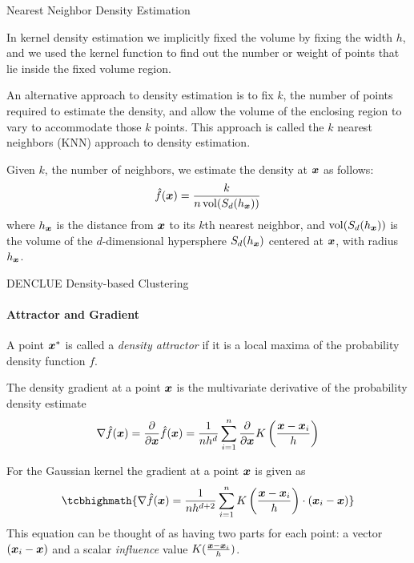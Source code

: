 \begin{frame}{Nearest Neighbor Density Estimation}

  In kernel density estimation we implicitly f\/{i}xed the
volume by f\/{i}xing the width $h$, and we used the
kernel function to f\/{i}nd out the number or weight of points that lie
inside the f\/{i}xed volume region. 

\medskip
An alternative approach to density
estimation is to f\/{i}x $k$, the number of points required to estimate the
density, and allow the volume of the enclosing region to vary to
accommodate those $k$ points. This
approach is called the $k$ nearest neighbors (KNN) approach to density
estimation. 

\medskip
Given $k$, the number of neighbors, we estimate the
density at ${\boldsymbol x}$ as follows:
\begin{align*}
  \hf(\bx) = \frac{k}{n \vol(S_d(h_\bx))}
\end{align*}
where $h_{\boldsymbol x}$ is the distance from ${\boldsymbol x}$ to its $k$th nearest
neighbor, and
$\vol(S_d(h_\bx))$ is the volume of the
$d$-dimensional hypersphere $S_d(h_{\boldsymbol x})$ centered at ${\boldsymbol x}$,
with radius $h_{\boldsymbol x}$.
\end{frame}



\begin{frame}{DENCLUE Density-based Clustering}
\framesubtitle{Attractor and Gradient}
A point ${\boldsymbol x}^*$ is called a {\em density attractor} if it is a
local maxima of the probability density function $f$.  

\medskip
The density gradient at a point ${\boldsymbol x}$ is the multivariate
derivative of the probability density estimate
\begin{align*}
    \nabla \kern3pt\hat{\kern-3pt f}({\boldsymbol x}) = {\partial \over \partial {\boldsymbol x}} \kern3pt\hat{\kern-3pt f}({\boldsymbol x}) =
     {1 \over n h^d}
     \sum_{i=1}^n {\partial \over \partial {\boldsymbol x}}
     K\left(\frac{{\boldsymbol x}-{\boldsymbol x}_i}{h}\right)
\end{align*}

\medskip
For the Gaussian kernel the gradient at a point ${\boldsymbol x}$ is given as
 \begin{align*}
\tcbhighmath{
     \grad \hf(\bx)  = {1 \over n h^{d+2}} \sum_{i=1}^n
        K\left(\frac{\bx-\bx_i}{h}\right)\cdot (\bx_i - \bx)
}
\end{align*}
This equation can be thought of as having two parts for each point: a
vector $({\boldsymbol x}_i-{\boldsymbol x})$ and a scalar {\em influence} value
$K(\frac{{\boldsymbol x}-{\boldsymbol x}_i}{h})$.
\end{frame}



